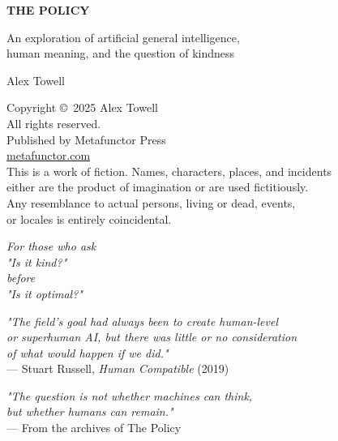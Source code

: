 \documentclass[12pt,letterpaper,oneside]{book}
\begin{document}
\frontmatter

\begin{titlepage}
\centering
\vspace*{2in}
{\Huge\bfseries THE POLICY\par}
\vspace{2in}
{\large An exploration of artificial general intelligence,\\
human meaning, and the question of kindness\par}
\vspace{1.5in}
{\Large Alex Towell\par}
\vfill
\end{titlepage}

\clearpage
\thispagestyle{empty}
\vspace*{\fill}
\begin{center}
\small
Copyright \copyright\ 2025 Alex Towell\\
All rights reserved.\\
\vspace{0.3in}
Published by Metafunctor Press\\
\href{https://metafunctor.com}{metafunctor.com}\\
\vspace{0.3in}
This is a work of fiction. Names, characters, places, and incidents\\
either are the product of imagination or are used fictitiously.\\
Any resemblance to actual persons, living or dead, events,\\
or locales is entirely coincidental.\\
\end{center}
\vspace*{\fill}
\clearpage

\clearpage
\thispagestyle{empty}
\vspace*{2in}
\begin{center}
\textit{For those who ask\\
"Is it kind?"\\
before\\
"Is it optimal?"}
\end{center}
\clearpage

\clearpage
\thispagestyle{empty}
\vspace*{2in}
\begin{center}
\textit{"The field's goal had always been to create human-level\\
or superhuman AI, but there was little or no consideration\\
of what would happen if we did."}\\
\vspace{0.3in}
--- Stuart Russell, \textit{Human Compatible} (2019)

\vspace{1in}

\textit{"The question is not whether machines can think,\\
but whether humans can remain."}\\
\vspace{0.3in}
--- From the archives of The Policy
\end{center}
\clearpage
\end{document}
